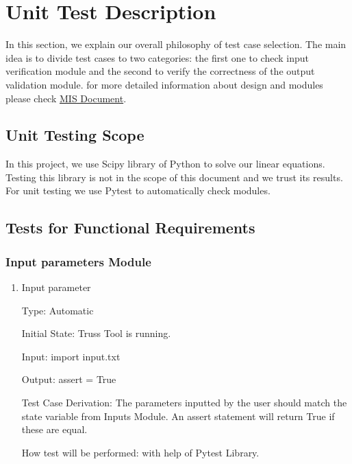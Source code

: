 \documentclass[12pt, titlepage]{article}
\begin{document}
\section{Unit Test Description} \label{sec_unitest}

In this section, we explain our overall philosophy of test case selection. The main idea is to divide test cases to two categories: the first one to check input verification module and the second to verify the correctness of the output validation module. for more detailed information about design and modules please check 
\href{https://github.com/Maryamvalian/project741/blob/de6c2a97c2152f912c1ed33a18b693b2e031ab56/docs/Design/SoftDetailedDes/MIS.pdf}{MIS Document}.

\subsection{Unit Testing Scope}
In this project, we use Scipy library of Python to solve our linear equations. Testing this library is not in the scope of this document and we trust its results. For unit testing we use Pytest to automatically check modules.


\subsection{Tests for Functional Requirements} 


\subsubsection{Input parameters Module} \label{t_in}


\begin{enumerate}

\item{Input parameter\\}

Type:  Automatic
					
Initial State: Truss Tool is running.
					
Input: import input.txt
					
Output: assert = True

Test Case Derivation: The parameters inputted by the user should 
match the state variable from Inputs Module. An assert statement
will return True if these are equal.

How test will be performed: with help of Pytest Library.
    
\end{enumerate}
\end{document}
